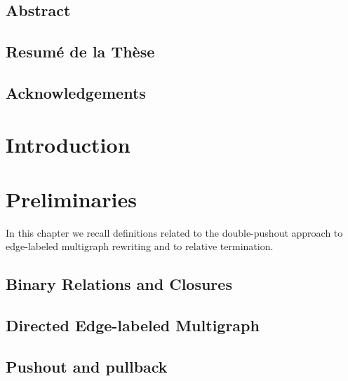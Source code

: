 \documentclass{report}
\begin{document}
  
   
  
 
\newpage
\section*{Abstract}

 
\newpage  
\section*{Resumé de la Thèse}
  
 
\newpage  
\section*{Acknowledgements} 

\newpage       
 
  
\tableofcontents   
\newpage      

\chapter{Introduction}  


\chapter{Preliminaries}
\label{chap:preliminaries}
In this chapter we recall definitions related to the double-pushout approach to edge-labeled multigraph rewriting and to relative termination. 
\section{Binary Relations and Closures}
\label{Preliminaries:BinaryRelations}

\section{Directed Edge-labeled Multigraph} 
\label{Preliminaries:Graphs}
 
\section{Pushout and pullback}  
\label{Preliminaries:Pushout}

\end{document}
